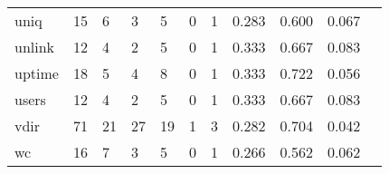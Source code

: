 \begin{longtable}{lp{1.2cm}p{1.2cm}p{1.2cm}p{1.2cm}p{1.2cm}p{1.2cm}p{1.2cm}p{1.2cm}p{1.2cm}p{1.2cm}}
uniq      &                                    15 &                                                  6 &                                                  3 &                                                  5 &                                                  0 &                                                  1 &                                         0.283 &                                              0.600 &                                              0.067 \\
unlink    &                                    12 &                                                  4 &                                                  2 &                                                  5 &                                                  0 &                                                  1 &                                         0.333 &                                              0.667 &                                              0.083 \\
uptime    &                                    18 &                                                  5 &                                                  4 &                                                  8 &                                                  0 &                                                  1 &                                         0.333 &                                              0.722 &                                              0.056 \\
users     &                                    12 &                                                  4 &                                                  2 &                                                  5 &                                                  0 &                                                  1 &                                         0.333 &                                              0.667 &                                              0.083 \\
vdir      &                                    71 &                                                 21 &                                                 27 &                                                 19 &                                                  1 &                                                  3 &                                         0.282 &                                              0.704 &                                              0.042 \\
wc        &                                    16 &                                                  7 &                                                  3 &                                                  5 &                                                  0 &                                                  1 &                                         0.266 &                                              0.562 &                                              0.062 \\

\end{longtable}
